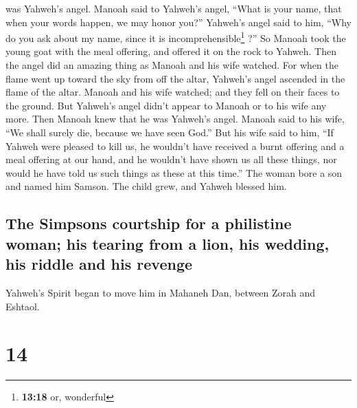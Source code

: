 was Yahweh's angel.  Manoah said to Yahweh's angel,
``What is your name, that when your words happen, we may honor you?''
 Yahweh's angel said to him, ``Why do you ask about my
name, since it is incomprehensible\footnote{\textbf{13:18} or, wonderful}
?''  So Manoah took the young goat with the meal
offering, and offered it on the rock to Yahweh. Then the angel did an
amazing thing as Manoah and his wife watched.  For when
the flame went up toward the sky from off the altar, Yahweh's angel
ascended in the flame of the altar. Manoah and his wife watched; and
they fell on their faces to the ground.  But Yahweh's
angel didn't appear to Manoah or to his wife any more. Then Manoah knew
that he was Yahweh's angel.  Manoah said to his wife,
``We shall surely die, because we have seen God.''  But
his wife said to him, ``If Yahweh were pleased to kill us, he wouldn't
have received a burnt offering and a meal offering at our hand, and he
wouldn't have shown us all these things, nor would he have told us such
things as these at this time.''  The woman bore a son and
named him Samson. The child grew, and Yahweh blessed him.

\hypertarget{the-simpsons-courtship-for-a-philistine-woman-his-tearing-from-a-lion-his-wedding-his-riddle-and-his-revenge}{%
\subsection{The Simpsons courtship for a philistine woman; his tearing
from a lion, his wedding, his riddle and his
revenge}\label{the-simpsons-courtship-for-a-philistine-woman-his-tearing-from-a-lion-his-wedding-his-riddle-and-his-revenge}}

 Yahweh's Spirit began to move him in Mahaneh Dan,
between Zorah and Eshtaol.

\hypertarget{section-13}{%
\section{14}\label{section-13}}

